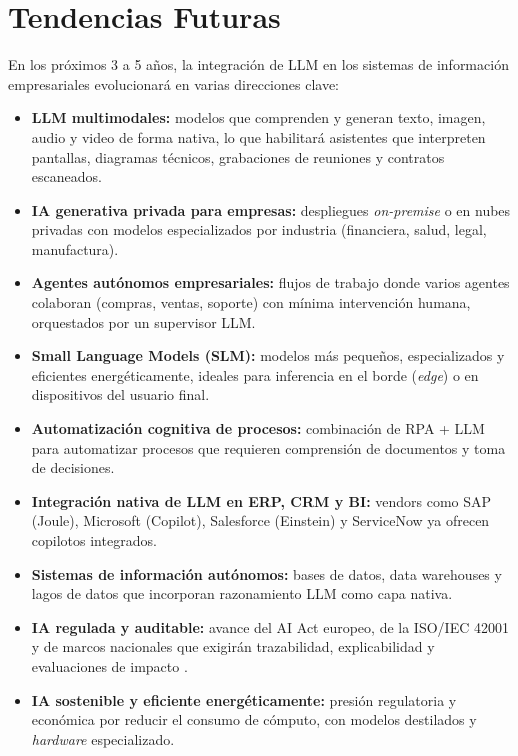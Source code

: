 \documentclass[12pt,a4paper,oneside]{article}
\begin{document}
\section{Tendencias Futuras}

En los próximos 3 a 5 años, la integración de LLM en los sistemas de información empresariales evolucionará en varias direcciones clave:

\begin{itemize}[leftmargin=*]
    \item \textbf{LLM multimodales:} modelos que comprenden y generan texto, imagen, audio y video de forma nativa, lo que habilitará asistentes que interpreten pantallas, diagramas técnicos, grabaciones de reuniones y contratos escaneados.
    \item \textbf{IA generativa privada para empresas:} despliegues \textit{on-premise} o en nubes privadas con modelos especializados por industria (financiera, salud, legal, manufactura).
    \item \textbf{Agentes autónomos empresariales:} flujos de trabajo donde varios agentes colaboran (compras, ventas, soporte) con mínima intervención humana, orquestados por un supervisor LLM.
    \item \textbf{Small Language Models (SLM):} modelos más pequeños, especializados y eficientes energéticamente, ideales para inferencia en el borde (\textit{edge}) o en dispositivos del usuario final.
    \item \textbf{Automatización cognitiva de procesos:} combinación de RPA + LLM para automatizar procesos que requieren comprensión de documentos y toma de decisiones.
    \item \textbf{Integración nativa de LLM en ERP, CRM y BI:} vendors como SAP (Joule), Microsoft (Copilot), Salesforce (Einstein) y ServiceNow ya ofrecen copilotos integrados.
    \item \textbf{Sistemas de información autónomos:} bases de datos, data warehouses y lagos de datos que incorporan razonamiento LLM como capa nativa.
    \item \textbf{IA regulada y auditable:} avance del AI Act europeo, de la ISO/IEC 42001 y de marcos nacionales que exigirán trazabilidad, explicabilidad y evaluaciones de impacto \cite{nistGenAI2024}.
    \item \textbf{IA sostenible y eficiente energéticamente:} presión regulatoria y económica por reducir el consumo de cómputo, con modelos destilados y \textit{hardware} especializado.
\end{itemize}
\end{document}
